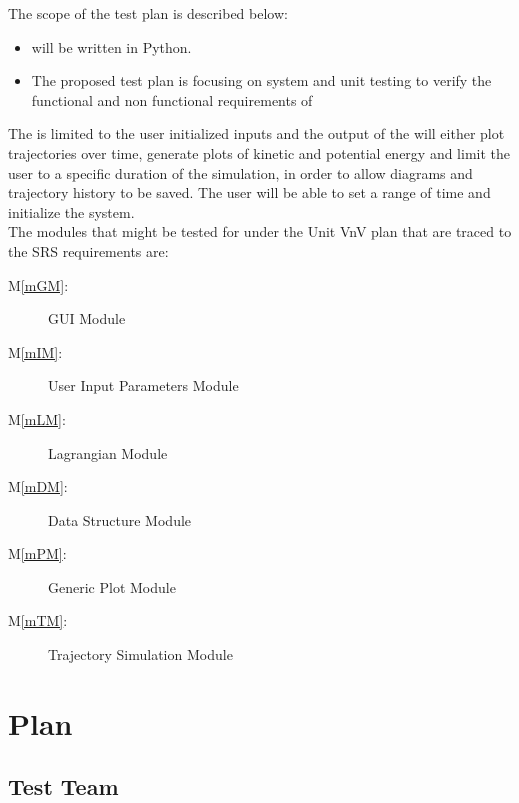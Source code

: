 \documentclass[12pt, titlepage]{article}
\newcommand{\mref}[1]{M\ref{#1}}
\begin{document}
The scope of the test plan is described below:
\begin{itemize}
\item \progname{} will be written in Python.
\item The proposed test plan is focusing on system and unit testing to
  verify the functional and non functional requirements of
  \progname{}
\end{itemize}

The \progname is limited to the user
initialized inputs and the output of the \progname will either plot trajectories over time, generate
plots of kinetic and potential energy and limit the user to a specific duration of the simulation, 
in order to allow diagrams and trajectory history to be saved.
The user will be able to set a range of time and initialize the system. \\

The modules that might be tested for under the Unit VnV plan that are traced to the SRS requirements are:
\begin{description}
\item [\mref{mGM}:] \progname GUI Module
\item [\mref{mIM}:] User Input Parameters Module
\item [\mref{mLM}:] Lagrangian Module
\item [\mref{mDM}:] Data Structure Module
\item [\mref{mPM}:] Generic Plot Module
\item [\mref{mTM}:] Trajectory Simulation Module
\end{description}


\section{Plan}
	

\subsection{Test Team}
\end{document}

